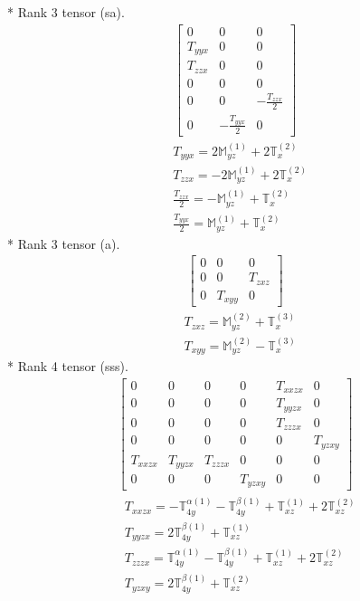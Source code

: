 \documentclass[fleqn,8pt,landscape]{jsarticle}
\begin{document}
* Rank 3 tensor (sa).
\begin{align*}
\begin{bmatrix} 0 & 0 & 0 \\ T_{yyx} & 0 & 0 \\ T_{zzx} & 0 & 0 \\ 0 & 0 & 0 \\ 0 & 0 & - \frac{T_{zzx}}{2} \\ 0 & - \frac{T_{yyx}}{2} & 0 \end{bmatrix}
\end{align*}
\begin{align*}
& T_{yyx} = 2 \mathbb{M}_{yz}^{(1)} + 2 \mathbb{T}_{x}^{(2)} \\
& T_{zzx} = - 2 \mathbb{M}_{yz}^{(1)} + 2 \mathbb{T}_{x}^{(2)} \\
& \frac{T_{zzx}}{2} = - \mathbb{M}_{yz}^{(1)} + \mathbb{T}_{x}^{(2)} \\
& \frac{T_{yyx}}{2} = \mathbb{M}_{yz}^{(1)} + \mathbb{T}_{x}^{(2)}
\end{align*}
* Rank 3 tensor (a).
\begin{align*}
\begin{bmatrix} 0 & 0 & 0 \\ 0 & 0 & T_{zxz} \\ 0 & T_{xyy} & 0 \end{bmatrix}
\end{align*}
\begin{align*}
& T_{zxz} = \mathbb{M}_{yz}^{(2)} + \mathbb{T}_{x}^{(3)} \\
& T_{xyy} = \mathbb{M}_{yz}^{(2)} - \mathbb{T}_{x}^{(3)}
\end{align*}
* Rank 4 tensor (sss).
\begin{align*}
\begin{bmatrix} 0 & 0 & 0 & 0 & T_{xxzx} & 0 \\ 0 & 0 & 0 & 0 & T_{yyzx} & 0 \\ 0 & 0 & 0 & 0 & T_{zzzx} & 0 \\ 0 & 0 & 0 & 0 & 0 & T_{yzxy} \\ T_{xxzx} & T_{yyzx} & T_{zzzx} & 0 & 0 & 0 \\ 0 & 0 & 0 & T_{yzxy} & 0 & 0 \end{bmatrix}
\end{align*}
\begin{align*}
& T_{xxzx} = - \mathbb{T}_{4y}^{\alpha(1)} - \mathbb{T}_{4y}^{\beta(1)} + \mathbb{T}_{xz}^{(1)} + 2 \mathbb{T}_{xz}^{(2)} \\
& T_{yyzx} = 2 \mathbb{T}_{4y}^{\beta(1)} + \mathbb{T}_{xz}^{(1)} \\
& T_{zzzx} = \mathbb{T}_{4y}^{\alpha(1)} - \mathbb{T}_{4y}^{\beta(1)} + \mathbb{T}_{xz}^{(1)} + 2 \mathbb{T}_{xz}^{(2)} \\
& T_{yzxy} = 2 \mathbb{T}_{4y}^{\beta(1)} + \mathbb{T}_{xz}^{(2)}
\end{align*}
\end{document}
